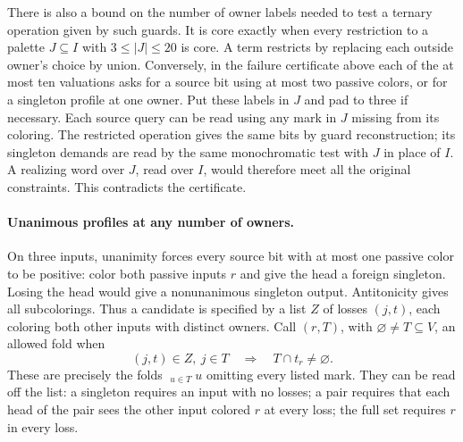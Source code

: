 There is also a bound on the number of owner labels needed to test a
ternary operation given by such guards. It is core exactly when every
restriction to a palette $J\subseteq I$ with $3\le |J|\le20$ is core.
A term restricts by replacing each outside owner's choice by union.
Conversely, in the failure certificate above each of the at most ten
valuations asks for a source bit using at most two passive colors, or
for a singleton profile at one owner. Put these labels in $J$ and pad
to three if necessary. Each source query can be read using any mark
in $J$ missing from its coloring. The restricted operation gives the
same bits by guard reconstruction; its singleton demands are read by
the same monochromatic test with $J$ in place of $I$. A realizing word
over $J$, read over $I$, would therefore meet all the original
constraints. This contradicts the certificate.

\paragraph{Unanimous profiles at any number of owners.}
On three inputs, unanimity forces every source bit with at most one
passive color to be positive: color both passive inputs $r$ and give
the head a foreign singleton. Losing the head would give a
nonunanimous singleton output. Antitonicity gives all subcolorings.
Thus a candidate is specified by a list $Z$ of losses $(j,t)$, each
coloring both other inputs with distinct owners. Call $(r,T)$, with
$\varnothing\ne T\subseteq V$, an allowed fold when
\[
 (j,t)\in Z,\ j\in T\quad\Longrightarrow\quad T\cap t_r\ne\varnothing.
\]
These are precisely the folds $\mathop{\star_r}_{u\in T}u$ omitting
every listed mark. They can be read off the list: a singleton requires
an input with no losses; a pair requires that each head of the pair
sees the other input colored $r$ at every loss; the full set requires
$r$ in every loss.

